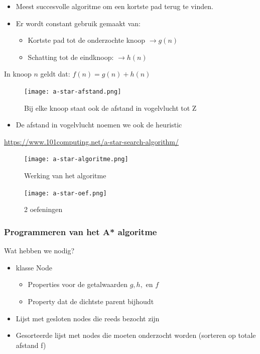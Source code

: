 \documentclass{article}
\begin{document}
\begin{itemize}
    \item Meest succesvolle algoritme om een kortste pad terug te vinden. 
    \item Er wordt constant gebruik gemaakt van:
    \begin{itemize}
        \item Kortste pad tot de onderzochte knoop $\rightarrow g(n)$
        \item Schatting tot de eindknoop: $\rightarrow h(n)$
    \end{itemize}
\end{itemize}

In knoop $n$ geldt dat: $f(n) = g(n) + h(n)$

\begin{figure}[H]
    \centering
    \texttt{[image: a-star-afstand.png]}
    \caption{Bij elke knoop staat ook de afstand in vogelvlucht tot Z}
\end{figure}

\begin{itemize}
    \item De afstand in vogelvlucht noemen we ook de heuristic 
\end{itemize}

\url{https://www.101computing.net/a-star-search-algorithm/}


\begin{figure}[H]
    \centering
    \texttt{[image: a-star-algoritme.png]}
    \caption{Werking van het algoritme}
\end{figure}

\begin{figure}[H]
    \centering
    \texttt{[image: a-star-oef.png]}
    \caption{2 oefeningen}
\end{figure}

\subsubsection{Programmeren van het A* algoritme}

Wat hebben we nodig?

\begin{itemize}
    \item klasse Node 
    \begin{itemize}
        \item Properties voor de getalwaarden $g, h,$ en $f$
        \item Property dat de dichtste parent bijhoudt
    \end{itemize}
    \item Lijst met gesloten nodes die reeds bezocht zijn
    \item Gesorteerde lijst met nodes die moeten onderzocht worden (sorteren op totale afstand f)
\end{itemize}
\end{document}
